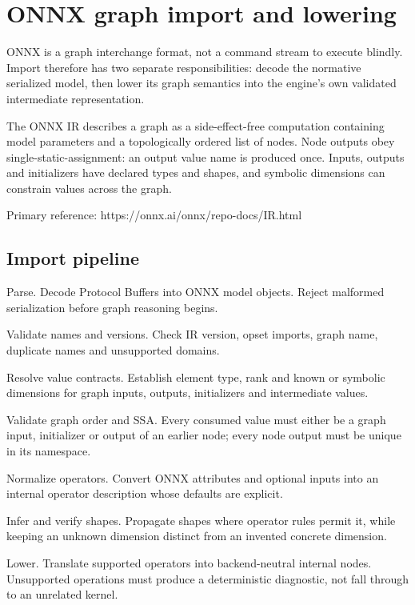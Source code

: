 \hypertarget{appendix-a87217e3af2b}{}\label{referencestart:appendix-a87217e3af2b}
\section{ONNX graph import and lowering}\label{appendix-a87217e3af2b-onnx-graph-import-and-lowering}

ONNX is a graph interchange format, not a command stream to execute blindly. Import therefore has two separate responsibilities: decode the normative serialized model, then lower its graph semantics into the engine's own validated intermediate representation.

The ONNX IR describes a graph as a side-effect-free computation containing model parameters and a topologically ordered list of nodes. Node outputs obey single-static-assignment: an output value name is produced once. Inputs, outputs and initializers have declared types and shapes, and symbolic dimensions can constrain values across the graph.

Primary reference: https://onnx.ai/onnx/repo-docs/IR.html

\subsection{Import pipeline}\label{appendix-a87217e3af2b-import-pipeline}

Parse. Decode Protocol Buffers into ONNX model objects. Reject malformed serialization before graph reasoning begins.

Validate names and versions. Check IR version, opset imports, graph name, duplicate names and unsupported domains.

Resolve value contracts. Establish element type, rank and known or symbolic dimensions for graph inputs, outputs, initializers and intermediate values.

Validate graph order and SSA. Every consumed value must either be a graph input, initializer or output of an earlier node; every node output must be unique in its namespace.

Normalize operators. Convert ONNX attributes and optional inputs into an internal operator description whose defaults are explicit.

Infer and verify shapes. Propagate shapes where operator rules permit it, while keeping an unknown dimension distinct from an invented concrete dimension.

Lower. Translate supported operators into backend-neutral internal nodes. Unsupported operations must produce a deterministic diagnostic, not fall through to an unrelated kernel.


